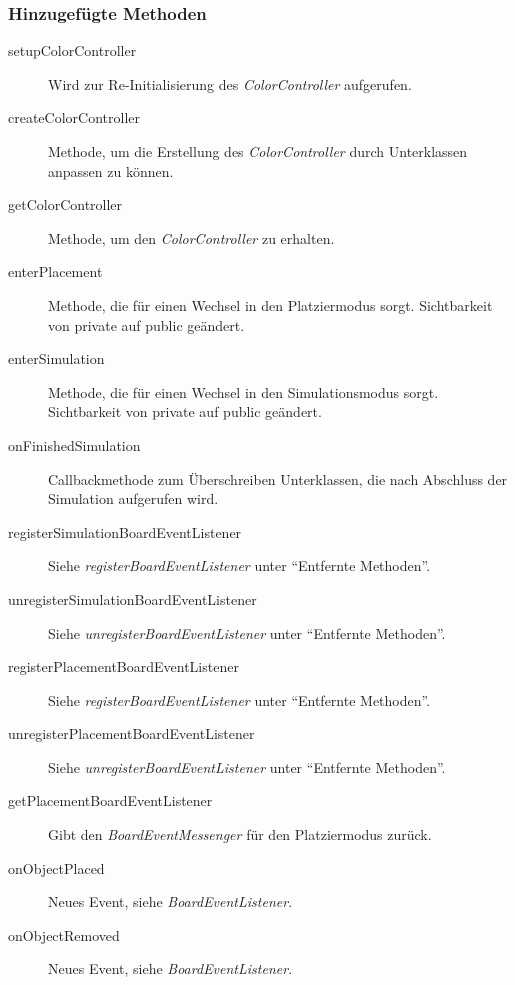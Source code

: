 \subsubsection{Hinzugefügte Methoden}
\begin{description}
\item[setupColorController]
Wird zur Re-Initialisierung des \emph{ColorController} aufgerufen.

\item[createColorController]
Methode, um die Erstellung des \emph{ColorController} durch Unterklassen anpassen zu können.

\item[getColorController]
Methode, um den \emph{ColorController} zu erhalten.

\item[enterPlacement]
Methode, die für einen Wechsel in den Platziermodus sorgt.
Sichtbarkeit von private auf public geändert.

\item[enterSimulation]
Methode, die für einen Wechsel in den Simulationsmodus sorgt.
Sichtbarkeit von private auf public geändert.

\item[onFinishedSimulation]
Callbackmethode zum Überschreiben Unterklassen, die nach Abschluss der Simulation aufgerufen wird.

\item[registerSimulationBoardEventListener]
Siehe \emph{registerBoardEventListener} unter "`Entfernte Methoden"'.

\item[unregisterSimulationBoardEventListener]
Siehe \emph{unregisterBoardEventListener} unter "`Entfernte Methoden"'.

\item[registerPlacementBoardEventListener]
Siehe \emph{registerBoardEventListener} unter "`Entfernte Methoden"'.

\item[unregisterPlacementBoardEventListener]
Siehe \emph{unregisterBoardEventListener} unter "`Entfernte Methoden"'.

\item[getPlacementBoardEventListener]
Gibt den \emph{BoardEventMessenger} für den Platziermodus zurück.

\item[onObjectPlaced]
Neues Event, siehe \emph{BoardEventListener}.

\item[onObjectRemoved]
Neues Event, siehe \emph{BoardEventListener}.


\end{description}
